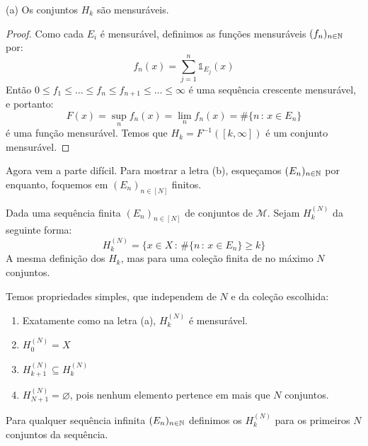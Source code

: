 \begin{prop}
    (a) Os conjuntos $H_k$ são mensuráveis.
\end{prop}
\begin{proof}
    Como cada $E_i$ é mensurável, definimos as funções mensuráveis $(f_n)_{n \in \mathbb{N}}$ por:
    $$f_n(x) = \sum_{j = 1}^{n} \mathds{1}_{E_j}(x)$$
    Então $0 \leq f_1 \leq \dots \leq f_n \leq f_{n+1} \leq \dots \leq \infty$ é uma sequência crescente
    mensurável, e portanto: 
    $$F(x) = \sup_n f_n(x) = \lim_n f_n(x) = \#\{n \, : \, x \in E_n \}$$
    é uma função mensurável. Temos que $H_k = F^{-1}([k,\infty])$ é um conjunto mensurável.
\end{proof}

Agora vem a parte difícil. Para mostrar a letra (b), esqueçamos $(E_n)_{n \in \mathbb{N}}$ por enquanto, foquemos
em $(E_n)_{n \in [N]}$ finitos.

\begin{definition}
    Dada uma sequência finita $(E_n)_{n \in [N]}$ de conjuntos de $\mathcal{M}$. Sejam $H_k^{(N)}$ da seguinte forma:
    $$H_k^{(N)} = \{x \in X \, : \, \#\{n \, : \, x \in E_n\} \geq k\}$$
    A mesma definição dos $H_k$, mas para uma coleção finita de no máximo $N$ conjuntos.
\end{definition}

\begin{observation}
    Temos propriedades simples, que independem de $N$ e da coleção escolhida:
    \begin{enumerate}
        \item Exatamente como na letra (a), $H_k^{(N)}$ é mensurável.
        \item $H_0^{(N)} = X$
        \item $H_{k+1}^{(N)} \subseteq H_{k}^{(N)}$
        \item $H_{N+1}^{(N)} = \varnothing$, pois nenhum elemento pertence em mais que $N$ conjuntos.
    \end{enumerate}
\end{observation}

Para qualquer sequência infinita $(E_n)_{n\in\mathbb{N}}$ definimos os $H_k^{(N)}$ para os primeiros $N$ conjuntos da sequência.

